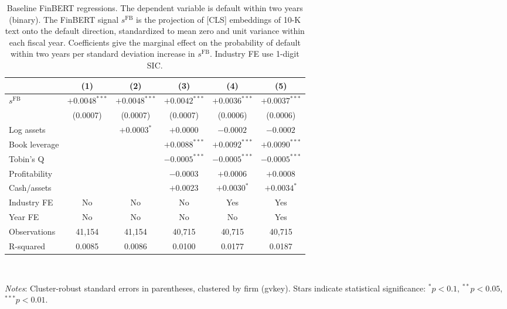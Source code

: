 \begin{table}[htbp]
\centering
\caption{Baseline FinBERT regressions. The dependent variable is default within two years (binary). The FinBERT signal $s^{\mathrm{FB}}$ is the projection of [CLS] embeddings of 10-K text onto the default direction, standardized to mean zero and unit variance within each fiscal year. Coefficients give the marginal effect on the probability of default within two years per standard deviation increase in $s^{\mathrm{FB}}$. Industry FE use 1-digit SIC.}
\label{tab:t2_baseline_finbert}
\small
\begin{tabular}{lccccc}
\toprule
 & (1) & (2) & (3) & (4) & (5) \\
\midrule
$s^{\mathrm{FB}}$ & $+0.0048^{***}$ & $+0.0048^{***}$ & $+0.0042^{***}$ & $+0.0036^{***}$ & $+0.0037^{***}$ \\
 & (0.0007) & (0.0007) & (0.0007) & (0.0006) & (0.0006) \\
\midrule
Log assets &  & $+0.0003^{*}$ & $+0.0000^{}$ & $-0.0002^{}$ & $-0.0002^{}$ \\
Book leverage &  &  & $+0.0088^{***}$ & $+0.0092^{***}$ & $+0.0090^{***}$ \\
Tobin's Q &  &  & $-0.0005^{***}$ & $-0.0005^{***}$ & $-0.0005^{***}$ \\
Profitability &  &  & $-0.0003^{}$ & $+0.0006^{}$ & $+0.0008^{}$ \\
Cash/assets &  &  & $+0.0023^{}$ & $+0.0030^{*}$ & $+0.0034^{*}$ \\
\midrule
Industry FE & No & No & No & Yes & Yes \\
Year FE & No & No & No & No & Yes \\
\midrule
Observations & 41,154 & 41,154 & 40,715 & 40,715 & 40,715 \\
R-squared & 0.0085 & 0.0086 & 0.0100 & 0.0177 & 0.0187 \\
\bottomrule
\end{tabular}
\\[-2ex]
\begin{flushleft}
\footnotesize
\textit{Notes}: Cluster-robust standard errors in parentheses, clustered by firm (gvkey). Stars indicate statistical significance: $^{*}p<0.1$, $^{**}p<0.05$, $^{***}p<0.01$.
\end{flushleft}
\end{table}